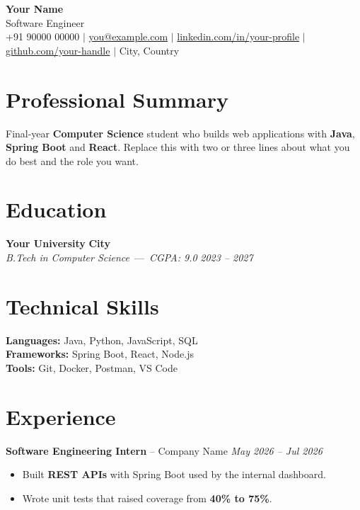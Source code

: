 \documentclass[10pt,a4paper]{article}
\begin{document}
\begin{flushleft}
{\huge\bfseries Your Name}\\[5pt]
{\large \color{accent}Software Engineer}\\[4pt]
{\small +91 90000 00000 $|$ \href{mailto:you@example.com}{you@example.com} $|$ \href{https://linkedin.com/in/your-profile}{linkedin.com/in/your-profile} $|$ \href{https://github.com/your-handle}{github.com/your-handle} $|$ City, Country}
\end{flushleft}

\section{Professional Summary}
Final-year \textbf{Computer Science} student who builds web applications with \textbf{Java}, \textbf{Spring Boot} and \textbf{React}. Replace this with two or three lines about what you do best and the role you want.

\section{Education}
\textbf{Your University} \hfill \textbf{City}\\
\textit{B.Tech in Computer Science} \,---\, \textit{CGPA: 9.0} \hfill \textit{2023 -- 2027}

\section{Technical Skills}
\textbf{Languages:} Java, Python, JavaScript, SQL\\
\textbf{Frameworks:} Spring Boot, React, Node.js\\
\textbf{Tools:} Git, Docker, Postman, VS Code

\section{Experience}
  \textbf{Software Engineering Intern} -- Company Name \hfill \textit{May 2026 -- Jul 2026}\\[-9pt]
  \begin{itemize}
    \item Built \textbf{REST APIs} with Spring Boot used by the internal dashboard.
    \item Wrote unit tests that raised coverage from \textbf{40\% to 75\%}.
  \end{itemize}
  \vspace{3pt}
\end{document}
